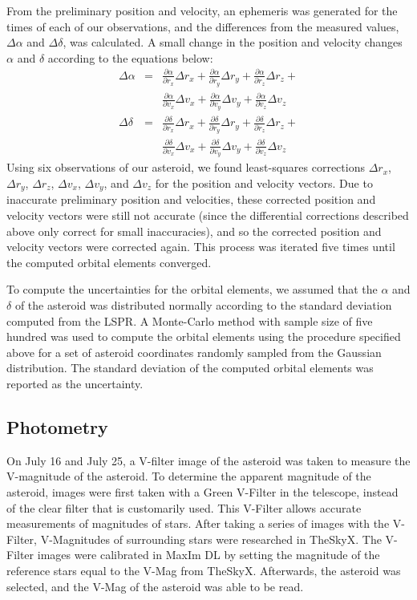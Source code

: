 \documentclass[12pt,journal,compsoc]{IEEEtran}
\begin{document}
From the preliminary position and velocity, an ephemeris was generated for the times of each of our observations, and the differences from the measured values, $\Delta \alpha$ and $\Delta \delta$, was calculated.
A small change in the position and velocity changes $\alpha$ and $\delta$ according to the equations below:
\begin{eqnarray*}
\Delta \alpha &=& \frac{\partial \alpha}{\partial r_x} \Delta r_x + \frac{\partial \alpha}{\partial r_y} \Delta r_y + \frac{\partial \alpha}{\partial r_z} \Delta r_z + \\& &
\frac{\partial \alpha}{\partial v_x} \Delta v_x + \frac{\partial \alpha}{\partial v_y} \Delta v_y + \frac{\partial \alpha}{\partial v_z} \Delta v_z   \\
\Delta \delta &=& \frac{\partial \delta}{\partial r_x} \Delta r_x + \frac{\partial \delta}{\partial r_y} \Delta r_y + \frac{\partial \delta}{\partial r_z} \Delta r_z + \\& &
\frac{\partial \delta}{\partial v_x} \Delta v_x + \frac{\partial \delta}{\partial v_y} \Delta v_y + \frac{\partial \delta}{\partial v_z} \Delta v_z
\end{eqnarray*}
Using six observations of our asteroid, we found least-squares corrections $\Delta r_x$, $\Delta r_y$, $\Delta r_z$, $\Delta v_x$, $\Delta v_y$, and $\Delta v_z$ for the position and velocity vectors.
Due to inaccurate preliminary position and velocities, these corrected position and velocity vectors were still not accurate (since the differential corrections described above only correct for small inaccuracies), and so the corrected position and velocity vectors were corrected again.
This process was iterated five times until the computed orbital elements converged.

To compute the uncertainties for the orbital elements, we assumed that the $\alpha$ and $\delta$ of the asteroid was distributed normally according to the standard deviation computed from the LSPR.
A Monte-Carlo method with sample size of five hundred was used to compute the orbital elements using the procedure specified above for a set of asteroid coordinates randomly sampled from the Gaussian distribution.
The standard deviation of the computed orbital elements was reported as the uncertainty.

\subsection{Photometry}
On July 16 and July 25, a V-filter image of the asteroid was taken to measure the V-magnitude of the asteroid.
To determine the apparent magnitude of the asteroid, images were first taken with a Green V-Filter in the telescope, instead of the clear filter that is customarily used.
This V-Filter allows accurate measurements of magnitudes of stars.
After taking a series of images with the V-Filter, V-Magnitudes of surrounding stars were researched in TheSkyX.
The V-Filter images were calibrated in MaxIm DL by setting the magnitude of the reference stars equal to the V-Mag from TheSkyX.
Afterwards, the asteroid was selected, and the V-Mag of the asteroid was able to be read. 
\end{document}
